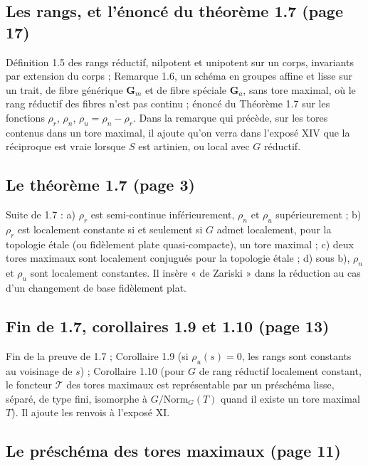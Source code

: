 \documentclass[11pt,a4paper]{article}
\begin{document}
\subsection*{Les rangs, et l'énoncé du théorème 1.7 (page 17)}

Définition 1.5 des rangs réductif, nilpotent et
unipotent sur un corps, invariants par extension du corps ; Remarque 1.6,
un schéma en groupes affine et lisse sur un trait, de fibre générique
$\mathbf{G}_{m}$ et de fibre spéciale $\mathbf{G}_{a}$, sans tore maximal,
où le rang réductif des fibres n'est pas continu ; énoncé du
Théorème 1.7 sur les fonctions $\rho_{r}$, $\rho_{n}$,
$\rho_{u} = \rho_{n} - \rho_{r}$. Dans la remarque qui précède, sur les
tores contenus dans un tore maximal, il ajoute qu'on verra dans l'exposé XIV
que la réciproque est vraie lorsque $S$ est artinien, ou local avec $G$
réductif.

\subsection*{Le théorème 1.7 (page 3)}

Suite de 1.7 : a) $\rho_{r}$ est semi-continue
inférieurement, $\rho_{n}$ et $\rho_{u}$ supérieurement ; b) $\rho_{r}$
est localement constante si et seulement si $G$ admet localement, pour la
topologie étale (ou fidèlement plate quasi-compacte), un tore maximal ;
c) deux tores maximaux sont localement conjugués pour la topologie
étale ; d) sous b), $\rho_{n}$ et $\rho_{u}$ sont localement constantes.
Il insère « de Zariski » dans la réduction au cas d'un changement de
base fidèlement plat.

\subsection*{Fin de 1.7, corollaires 1.9 et 1.10 (page 13)}

Fin de la preuve de 1.7 ; Corollaire 1.9 (si
$\rho_{u}(s) = 0$, les rangs sont constants au voisinage de $s$) ;
Corollaire 1.10 (pour $G$ de rang réductif localement constant, le
foncteur $\mathcal{T}$ des tores maximaux est représentable par un
préschéma lisse, séparé, de type fini, isomorphe à $G/\mathrm{Norm}_{G}(T)$
quand il existe un tore maximal $T$). Il ajoute les renvois à l'exposé XI.

\subsection*{Le préschéma des tores maximaux (page 11)}
\end{document}
